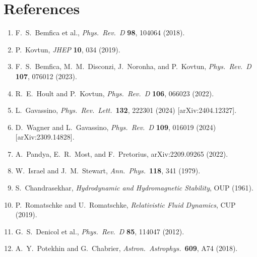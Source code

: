 \section*{References}

\begin{enumerate}
\item F.~S.~Bemfica et al., \textit{Phys.\ Rev.\ D} \textbf{98}, 104064 (2018).
\item P.~Kovtun, \textit{JHEP} \textbf{10}, 034 (2019).
\item F.~S.~Bemfica, M.~M.~Disconzi, J.~Noronha, and P.~Kovtun,
  \textit{Phys.\ Rev.\ D} \textbf{107}, 076012 (2023).
\item R.~E.~Hoult and P.~Kovtun, \textit{Phys.\ Rev.\ D} \textbf{106}, 066023 (2022).
\item L.~Gavassino, \textit{Phys.\ Rev.\ Lett.}\ \textbf{132}, 222301 (2024) [arXiv:2404.12327].
\item D.~Wagner and L.~Gavassino, \textit{Phys.\ Rev.\ D} \textbf{109}, 016019 (2024) [arXiv:2309.14828].
\item A.~Pandya, E.~R.~Most, and F.~Pretorius, arXiv:2209.09265 (2022).
\item W.~Israel and J.~M.~Stewart, \textit{Ann.\ Phys.}\ \textbf{118}, 341 (1979).
\item S.~Chandrasekhar, \textit{Hydrodynamic and Hydromagnetic Stability}, OUP (1961).
\item P.~Romatschke and U.~Romatschke, \textit{Relativistic Fluid Dynamics}, CUP (2019).
\item G.~S.~Denicol et al., \textit{Phys.\ Rev.\ D} \textbf{85}, 114047 (2012).
\item A.~Y.~Potekhin and G.~Chabrier, \textit{Astron.\ Astrophys.}\ \textbf{609}, A74 (2018).
\end{enumerate}
